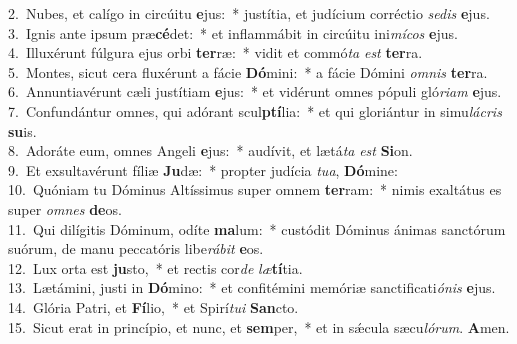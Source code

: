 {2.~}Nubes, et calígo in circúitu \textbf{e}jus:~* justítia, et judícium corréctio \textit{se}\textit{dis} \textbf{e}jus.\\
{3.~}Ignis ante ipsum præ\textbf{cé}det:~* et inflammábit in circúitu ini\textit{mí}\textit{cos} \textbf{e}jus.\\
{4.~}Illuxérunt fúlgura ejus orbi \textbf{ter}ræ:~* vidit et commó\textit{ta} \textit{est} \textbf{ter}ra.\\
{5.~}Montes, sicut cera fluxérunt a fácie \textbf{Dó}mini:~* a fácie Dómini \textit{om}\textit{nis} \textbf{ter}ra.\\
{6.~}Annuntiavérunt cæli justítiam \textbf{e}jus:~* et vidérunt omnes pópuli gló\textit{ri}\textit{am} \textbf{e}jus.\\
{7.~}Confundántur omnes, qui adórant scul\textbf{ptí}lia:~* et qui gloriántur in simu\textit{lá}\textit{cris} \textbf{su}is.\\
{8.~}Adoráte eum, omnes Angeli \textbf{e}jus:~* audívit, et lætá\textit{ta} \textit{est} \textbf{Si}on.\\
{9.~}Et exsultavérunt fíliæ \textbf{Ju}dæ:~* propter judícia \textit{tu}\textit{a}, \textbf{Dó}mine:\\
{10.~}Quóniam tu Dóminus Altíssimus super omnem \textbf{ter}ram:~* nimis exaltátus es super \textit{om}\textit{nes} \textbf{de}os.\\
{11.~}Qui dilígitis Dóminum, odíte \textbf{ma}lum:~* custódit Dóminus ánimas sanctórum suórum, de manu peccatóris libe\textit{rá}\textit{bit} \textbf{e}os.\\
{12.~}Lux orta est \textbf{ju}sto,~* et rectis cor\textit{de} \textit{læ}\textbf{tí}tia.\\
{13.~}Lætámini, justi in \textbf{Dó}mino:~* et confitémini memóriæ sanctificati\textit{ó}\textit{nis} \textbf{e}jus.\\
{14.~}Glória Patri, et \textbf{Fí}lio,~* et Spirí\textit{tu}\textit{i} \textbf{San}cto.\\
{15.~}Sicut erat in princípio, et nunc, et \textbf{sem}per,~* et in sǽcula sæcu\textit{ló}\textit{rum}. \textbf{A}men.\\
